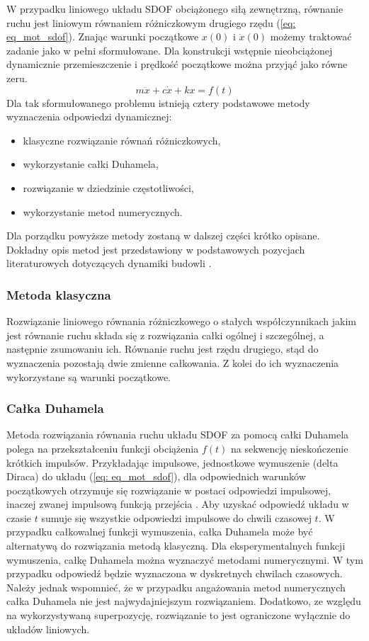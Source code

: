 W przypadku liniowego układu SDOF obciążonego siłą zewnętrzną, równanie ruchu jest liniowym równaniem różniczkowym drugiego rzędu (\ref{eq: eq_mot_sdof}). Znając warunki początkowe $x(0)$ i $\dot{x}(0)$ możemy traktować zadanie jako w pełni sformułowane. Dla konstrukcji wstępnie nieobciążonej dynamicznie przemieszczenie i prędkość początkowe można przyjąć jako równe zeru.
\begin{equation} \label{eq: eq_mot_sdof}
	m\ddot{x}+c\dot{x}+k{x}=f(t)
\end{equation}
Dla tak sformułowanego problemu istnieją cztery podstawowe metody wyznaczenia odpowiedzi dynamicznej:
\begin{itemize}[noitemsep]
	\item klasyczne rozwiązanie równań różniczkowych,
	\item wykorzystanie całki Duhamela,
	\item rozwiązanie w dziedzinie częstotliwości,
	\item wykorzystanie metod numerycznych.
\end{itemize}
Dla porządku powyższe metody zostaną w dalszej części krótko opisane. Dokładny opis metod jest przedstawiony w podstawowych pozycjach literaturowych dotyczących dynamiki budowli \parencite{Clough1975,Chmielewski1998,Chopra2012a,Bajer2012}. 

\subsubsection{Metoda klasyczna}

Rozwiązanie liniowego równania różniczkowego o stałych współczynnikach jakim jest równanie ruchu składa się z rozwiązania całki ogólnej i szczególnej, a następnie zsumowaniu ich. Równanie ruchu jest rzędu drugiego, stąd do wyznaczenia pozostają dwie zmienne całkowania. Z kolei do ich wyznaczenia wykorzystane są warunki początkowe.

\subsubsection{Całka Duhamela}

Metoda rozwiązania równania ruchu układu SDOF za pomocą całki Duhamela polega na przekształceniu funkcji obciążenia $f(t)$ na sekwencję nieskończenie krótkich impulsów. Przykładając impulsowe, jednostkowe wymuszenie (delta Diraca) do układu (\ref{eq: eq_mot_sdof}), dla odpowiednich warunków początkowych otrzymuje się rozwiązanie w postaci odpowiedzi impulsowej, inaczej zwanej impulsową funkcją przejścia . Aby uzyskać odpowiedź układu w czasie $t$ sumuje się wszystkie odpowiedzi impulsowe do chwili czasowej $t$. W przypadku całkowalnej funkcji wymuszenia, całka Duhamela może być alternatywą do rozwiązania metodą klasyczną. Dla eksperymentalnych funkcji wymuszenia, całkę Duhamela można wyznaczyć metodami numerycznymi. W tym przypadku odpowiedź będzie wyznaczona w dyskretnych chwilach czasowych. Należy jednak wspomnieć, że w przypadku angażowania metod numerycznych całka Duhamela nie jest najwydajniejszym rozwiązaniem. Dodatkowo, ze względu na wykorzystywaną superpozycję, rozwiązanie to jest ograniczone wyłącznie do układów liniowych.

